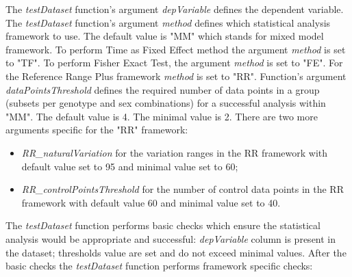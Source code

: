 \documentclass[a4paper]{article}
\begin{document}
\newline\newline
The \textit{testDataset} function's argument \textit{depVariable} defines the dependent variable.
\newline\newline
The \textit{testDataset} function's argument \textit{method} defines which statistical analysis framework to use. 
The default value is "MM" which stands for mixed model framework. To perform Time as Fixed Effect method the argument \textit{method} is set to "TF". To perform Fisher Exact Test, the argument \textit{method} is set to "FE". For the Reference Range Plus framework \textit{method} is set to "RR".
\newline\newline
Function's argument \textit{dataPointsThreshold} defines the required number of data points in a group (subsets per genotype and sex combinations) for a successful analysis within "MM". The default value is 4. The minimal value is 2.
\newline\newline
There are two more arguments specific for the "RR" framework: 
\begin{itemize}
\item \textit{RR\_naturalVariation} for the variation ranges in the RR framework with default value set to 95 and minimal value set to 60; 
\item \textit{RR\_controlPointsThreshold} for the number of control data points in the RR framework with default value 60 and minimal value set to 40.
\end{itemize}
The \textit{testDataset} function performs basic checks which ensure the statistical analysis would be appropriate and successful: \textit{depVariable} column is present in the dataset; thresholds value are set and do not exceed minimal values.
\newline\newline
After the basic checks the \textit{testDataset} function performs framework specific checks:
\end{document}
